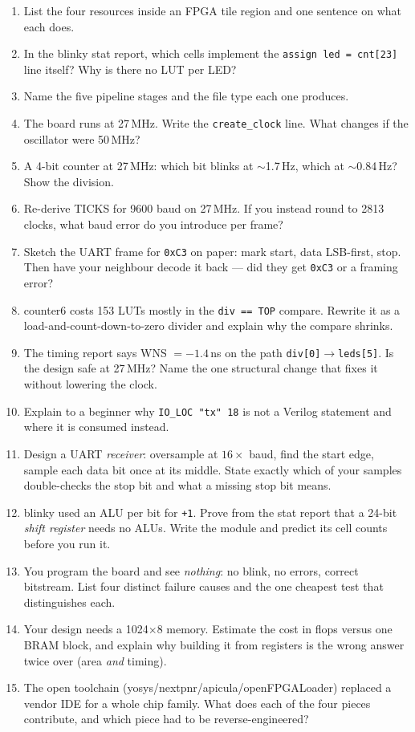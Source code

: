 \begin{enumerate}
\item[{[}easy{]}] List the four resources inside an FPGA tile region and one
sentence on what each does.
\item[{[}easy{]}] In the blinky stat report, which cells implement the
\texttt{assign led = cnt[23]} line itself? Why is there no LUT per LED?
\item[{[}easy{]}] Name the five pipeline stages and the file type each one
produces.
\item[{[}easy{]}] The board runs at 27\,MHz. Write the
\texttt{create\_clock} line. What changes if the oscillator were 50\,MHz?
\item[{[}medium{]}] A 4-bit counter at 27\,MHz: which bit blinks at
$\sim$1.7\,Hz, which at $\sim$0.84\,Hz? Show the division.
\item[{[}medium{]}] Re-derive TICKS for 9600 baud on 27\,MHz. If you instead
round to 2813 clocks, what baud error do you introduce per frame?
\item[{[}medium{]}] Sketch the UART frame for \texttt{0xC3} on paper: mark
start, data LSB-first, stop. Then have your neighbour decode it back ---
did they get \texttt{0xC3} or a framing error?
\item[{[}medium{]}] counter6 costs 153 LUTs mostly in the
\texttt{div == TOP} compare. Rewrite it as a load-and-count-down-to-zero
divider and explain why the compare shrinks.
\item[{[}medium{]}] The timing report says WNS $= -1.4$\,ns on the path
\texttt{div[0]$\to$leds[5]}. Is the design safe at 27\,MHz? Name the one
structural change that fixes it without lowering the clock.
\item[{[}medium{]}] Explain to a beginner why \texttt{IO\_LOC "tx" 18} is not
a Verilog statement and where it is consumed instead.
\item[{[}hard{]}] Design a UART \emph{receiver}: oversample at
$16\times$ baud, find the start edge, sample each data bit once at its
middle. State exactly which of your samples double-checks the stop bit and
what a missing stop bit means.
\item[{[}hard{]}] blinky used an ALU per bit for \texttt{+1}. Prove from the
stat report that a 24-bit \emph{shift register} needs no ALUs. Write the
module and predict its cell counts before you run it.
\item[{[}hard{]}] You program the board and see \emph{nothing}: no blink, no
errors, correct bitstream. List four distinct failure causes and the one
cheapest test that distinguishes each.
\item[{[}hard{]}] Your design needs a 1024$\times$8 memory. Estimate the cost
in flops versus one BRAM block, and explain why building it from registers is
the wrong answer twice over (area \emph{and} timing).
\item[{[}hard{]}] The open toolchain (yosys/nextpnr/apicula/openFPGALoader)
replaced a vendor IDE for a whole chip family. What does each of the four
pieces contribute, and which piece had to be reverse-engineered?
\end{enumerate}

